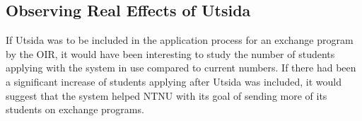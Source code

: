 \subsection{Observing Real Effects of Utsida}
If Utsida was to be included in the application process for an exchange program by the OIR, it would have been interesting to study the number of students applying with the system in use compared to current numbers. If there had been a significant increase of students applying after Utsida was included, it would suggest that the system helped NTNU with its goal of sending more of its students on exchange programs.



\cleardoublepage